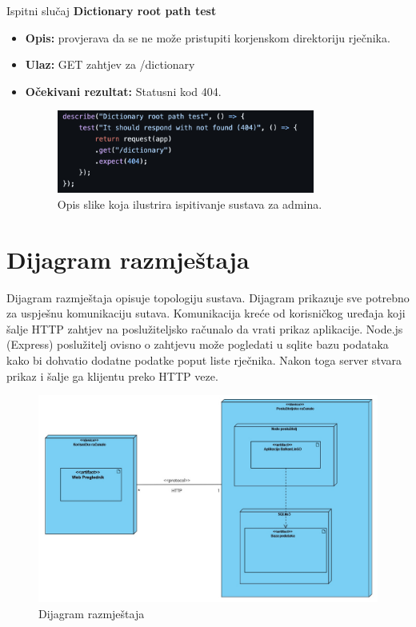 			Ispitni slučaj \textbf{Dictionary root path test}
			\begin{itemize}
				\item \textbf{Opis:} provjerava da se ne može pristupiti korjenskom direktoriju rječnika.
				\item \textbf{Ulaz:} GET zahtjev za /dictionary
				\item \textbf{Očekivani rezultat:} Statusni kod 404.
				\begin{figure}[h]
					\centering
					\includegraphics[width=0.8\textwidth]{slike/testovi/admin_404_test.png}
					\caption{Opis slike koja ilustrira ispitivanje sustava za admina.}
					\label{fig:testovi_admin_slika}
				\end{figure}
			\end{itemize}
			
			\eject 
		
		
		\section{Dijagram razmještaja}
			
		Dijagram razmještaja opisuje topologiju sustava. Dijagram prikazuje sve potrebno za uspješnu komunikaciju sutava. Komunikacija kreće od korisničkog uređaja koji šalje HTTP zahtjev na poslužiteljsko računalo da vrati prikaz aplikacije. Node.js (Express) poslužitelj ovisno o zahtjevu može pogledati u sqlite bazu podataka kako bi dohvatio dodatne podatke poput liste rječnika. Nakon toga server stvara prikaz i šalje ga klijentu preko HTTP veze.
			\begin{figure}[h]
				\centering
				\includegraphics[width=1\textwidth]{dijagrami/DijagamRazmjestaja.jpg}
				\caption{Dijagram razmještaja}
				\label{fig:dijagram_razmjestaja}
			\end{figure}	

